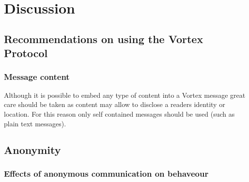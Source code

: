
\part{Discussion}

\chapter{Recommendations on using the Vortex Protocol}

\section{Message content}
Although it is possible to embed any type of content into a Vortex message great care should be taken as content may allow to disclose a readers identity or location. For this reason only self contained messages should be used (such as plain text messages).



\chapter{Anonymity}

\section{Effects of anonymous communication on behaveour}



